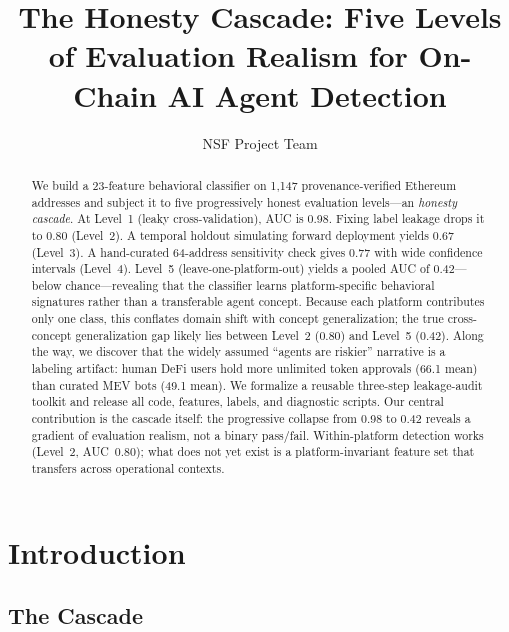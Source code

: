 \documentclass[sigconf,nonacm=false]{acmart}
\begin{document}
\title{The Honesty Cascade: Five Levels of Evaluation Realism for On-Chain AI Agent Detection}
\author{NSF Project Team}

\begin{abstract}
We build a 23-feature behavioral classifier on 1,147 provenance-verified Ethereum addresses and subject it to five progressively honest evaluation levels---an \emph{honesty cascade}. At Level~1 (leaky cross-validation), AUC is 0.98. Fixing label leakage drops it to 0.80 (Level~2). A temporal holdout simulating forward deployment yields 0.67 (Level~3). A hand-curated 64-address sensitivity check gives 0.77 with wide confidence intervals (Level~4). Level~5 (leave-one-platform-out) yields a pooled AUC of 0.42---below chance---revealing that the classifier learns platform-specific behavioral signatures rather than a transferable agent concept. Because each platform contributes only one class, this conflates domain shift with concept generalization; the true cross-concept generalization gap likely lies between Level~2 (0.80) and Level~5 (0.42). Along the way, we discover that the widely assumed ``agents are riskier'' narrative is a labeling artifact: human DeFi users hold more unlimited token approvals (66.1 mean) than curated MEV bots (49.1 mean). We formalize a reusable three-step leakage-audit toolkit and release all code, features, labels, and diagnostic scripts. Our central contribution is the cascade itself: the progressive collapse from 0.98 to 0.42 reveals a gradient of evaluation realism, not a binary pass/fail. Within-platform detection works (Level~2, AUC~0.80); what does not yet exist is a platform-invariant feature set that transfers across operational contexts.
\end{abstract}

\maketitle

\section{Introduction}

\subsection{The Cascade}
\end{document}
